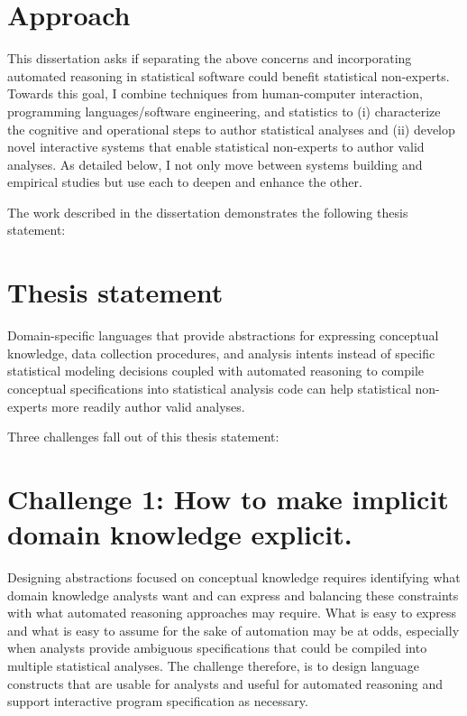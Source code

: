 \section*{Approach}
This dissertation asks if separating the above concerns and incorporating
automated reasoning in statistical software could benefit statistical
non-experts. Towards this goal, I combine techniques from human-computer
interaction, programming languages/software engineering, and statistics to (i)
characterize the cognitive and operational steps to author statistical analyses
and (ii) develop novel interactive systems that enable statistical non-experts
to author valid analyses. As detailed below, I not only move between systems
building and empirical studies but use each to deepen and enhance the other.

The work described in the dissertation demonstrates the following thesis statement: 

\section*{Thesis statement}

Domain-specific languages that provide abstractions for expressing conceptual
knowledge, data collection procedures, and analysis intents instead of specific
statistical modeling decisions coupled with automated reasoning to compile
conceptual specifications into statistical analysis code can help statistical
non-experts more readily author valid analyses. 

Three challenges fall out of this thesis statement: 

\section*{Challenge 1: How to make implicit domain knowledge explicit.} %
Designing abstractions focused on conceptual knowledge requires identifying what
domain knowledge analysts want and can express and balancing these constraints
with what automated reasoning approaches may require. What is easy to express
and what is easy to assume for the sake of automation may be at odds, especially
when analysts provide ambiguous specifications that could be compiled into
multiple statistical analyses. The challenge therefore, is to design language
constructs that are usable for analysts and useful for automated reasoning and
support interactive program specification as necessary.

